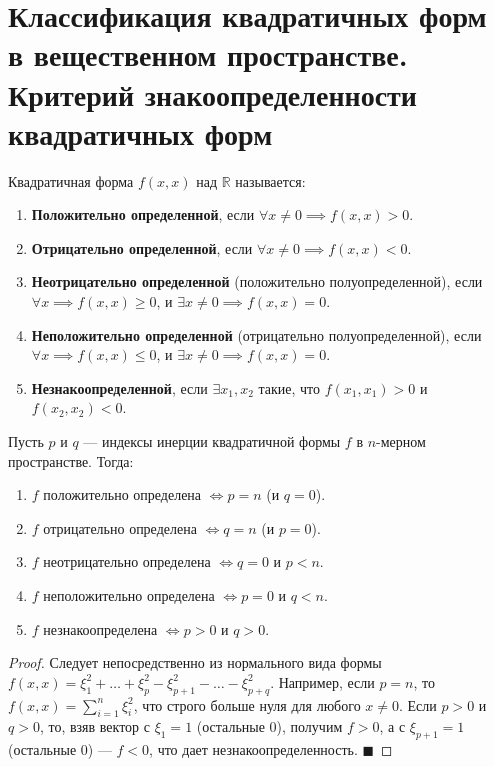 \section{Классификация квадратичных форм в вещественном пространстве. Критерий знакоопределенности квадратичных форм}

\begin{definition}
Квадратичная форма $f(x, x)$ над $\mathbb{R}$ называется:
\begin{enumerate}
    \item \textbf{Положительно определенной}, если $\forall x \neq 0 \implies f(x, x) > 0$.
    \item \textbf{Отрицательно определенной}, если $\forall x \neq 0 \implies f(x, x) < 0$.
    \item \textbf{Неотрицательно определенной} (положительно полуопределенной), если $\forall x \implies f(x, x) \ge 0$, и $\exists x \neq 0 \implies f(x, x) = 0$.
    \item \textbf{Неположительно определенной} (отрицательно полуопределенной), если $\forall x \implies f(x, x) \le 0$, и $\exists x \neq 0 \implies f(x, x) = 0$.
    \item \textbf{Незнакоопределенной}, если $\exists x_1, x_2$ такие, что $f(x_1, x_1) > 0$ и $f(x_2, x_2) < 0$.
\end{enumerate}
\end{definition}

\begin{theorem}
Пусть $p$ и $q$ --- индексы инерции квадратичной формы $f$ в $n$-мерном пространстве. Тогда:
\begin{enumerate}
    \item $f$ положительно определена $\iff p = n$ (и $q = 0$).
    \item $f$ отрицательно определена $\iff q = n$ (и $p = 0$).
    \item $f$ неотрицательно определена $\iff q = 0$ и $p < n$.
    \item $f$ неположительно определена $\iff p = 0$ и $q < n$.
    \item $f$ незнакоопределена $\iff p > 0$ и $q > 0$.
\end{enumerate}
\end{theorem}

\begin{proof}
Следует непосредственно из нормального вида формы $f(x, x) = \xi_1^2 + \dots + \xi_p^2 - \xi_{p+1}^2 - \dots - \xi_{p+q}^2$. Например, если $p=n$, то $f(x, x) = \sum_{i=1}^n \xi_i^2$, что строго больше нуля для любого $x \neq 0$. Если $p>0$ и $q>0$, то, взяв вектор с $\xi_1=1$ (остальные 0), получим $f>0$, а с $\xi_{p+1}=1$ (остальные 0) --- $f<0$, что дает незнакоопределенность.
\hfill$\blacksquare$
\end{proof}

